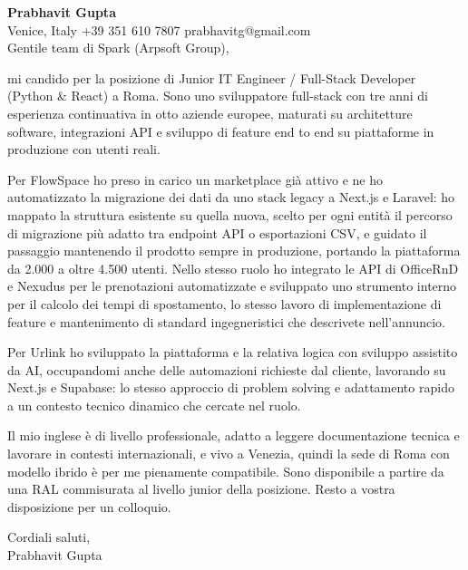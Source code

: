 \documentclass[a4paper,10.5pt]{article}
\begin{document}
\textbf{Prabhavit Gupta}\\
Venice, Italy \textbar{} +39 351 610 7807 \textbar{} prabhavitg@gmail.com\\[10pt]
Gentile team di Spark (Arpsoft Group),

mi candido per la posizione di Junior IT Engineer / Full-Stack Developer (Python \& React) a Roma. Sono uno sviluppatore full-stack con tre anni di esperienza continuativa in otto aziende europee, maturati su architetture software, integrazioni API e sviluppo di feature end to end su piattaforme in produzione con utenti reali.

Per FlowSpace ho preso in carico un marketplace già attivo e ne ho automatizzato la migrazione dei dati da uno stack legacy a Next.js e Laravel: ho mappato la struttura esistente su quella nuova, scelto per ogni entità il percorso di migrazione più adatto tra endpoint API o esportazioni CSV, e guidato il passaggio mantenendo il prodotto sempre in produzione, portando la piattaforma da 2.000 a oltre 4.500 utenti. Nello stesso ruolo ho integrato le API di OfficeRnD e Nexudus per le prenotazioni automatizzate e sviluppato uno strumento interno per il calcolo dei tempi di spostamento, lo stesso lavoro di implementazione di feature e mantenimento di standard ingegneristici che descrivete nell'annuncio.

Per Urlink ho sviluppato la piattaforma e la relativa logica con sviluppo assistito da AI, occupandomi anche delle automazioni richieste dal cliente, lavorando su Next.js e Supabase: lo stesso approccio di problem solving e adattamento rapido a un contesto tecnico dinamico che cercate nel ruolo.

Il mio inglese è di livello professionale, adatto a leggere documentazione tecnica e lavorare in contesti internazionali, e vivo a Venezia, quindi la sede di Roma con modello ibrido è per me pienamente compatibile. Sono disponibile a partire da una RAL commisurata al livello junior della posizione. Resto a vostra disposizione per un colloquio.

Cordiali saluti,\\
Prabhavit Gupta
\end{document}
